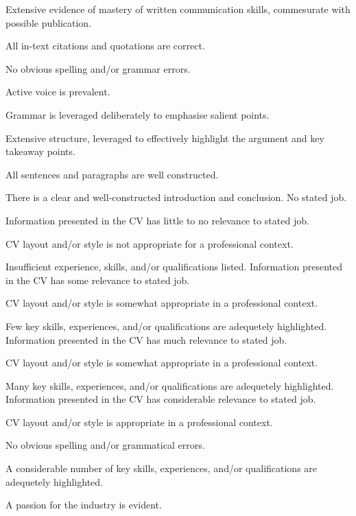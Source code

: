\documentclass{../../fal_assignment}
\begin{document}
\begin{markingrubric}
        \grade 		Extensive evidence of mastery of written communication skills, commesurate with possible publication.
        \par 		All in-text citations and quotations are correct.
        \par 		No obvious spelling and/or grammar errors.
        \par 		Active voice is prevalent.
        \par 		Grammar is leveraged deliberately to emphasise salient points.     
        \par 		Extensive structure, leveraged to effectively highlight the argument and key takeaway points.
        \par 		All sentences and paragraphs are well constructed.
        \par 		There is a clear and well-constructed introduction and conclusion.
%        
        \grade \fail  			No stated job.
    		    \par 		Information presented in the CV has little to no relevance to stated job.
        		\par 			CV layout and/or style is not appropriate for a professional context.			
        		\par 			Insufficient experience, skills, and/or qualifications listed.
        \grade 				Information presented in the CV has some relevance to stated job.
        		\par 			CV layout and/or style is somewhat appropriate in a professional context.
        		\par 			Few key skills, experiences, and/or qualifications are adequetely highlighted. 
	\grade 			Information presented in the CV has much relevance to stated job.
		\par			CV layout and/or style is somewhat appropriate in a professional context.
        		\par 			Many key skills, experiences, and/or qualifications are adequetely highlighted. 
        \grade 				Information presented in the CV has considerable relevance to stated job.
		\par			CV layout and/or style is appropriate in a professional context.
		\par			No obvious spelling and/or grammatical errors.
        		\par 			A considerable number of key skills, experiences, and/or qualifications are adequetely highlighted. 
		\par			A passion for the industry is evident.

\end{markingrubric}
\end{document}
